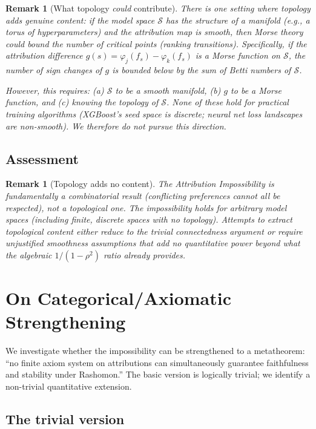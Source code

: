 \documentclass{article}
\newtheorem{remark}[theorem]{Remark}
\begin{document}
\begin{remark}[What topology \emph{could} contribute]
There is one setting where topology adds genuine content: if the
model space $\mathcal{S}$ has the structure of a manifold (e.g.,
a torus of hyperparameters) and the attribution map is smooth,
then Morse theory could bound the number of critical points
(ranking transitions). Specifically, if the attribution difference
$g(s) = \varphi_j(f_s) - \varphi_k(f_s)$ is a Morse function on
$\mathcal{S}$, the number of sign changes of $g$ is bounded below
by the sum of Betti numbers of $\mathcal{S}$.

However, this requires: (a) $\mathcal{S}$ to be a smooth manifold,
(b) $g$ to be a Morse function, and (c) knowing the topology of
$\mathcal{S}$. None of these hold for practical training algorithms
(XGBoost's seed space is discrete; neural net loss landscapes are
non-smooth). We therefore do not pursue this direction.
\end{remark}

\subsection{Assessment}

\begin{remark}[Topology adds no content]
\label{rem:topology-trivial}
The Attribution Impossibility is fundamentally a \emph{combinatorial}
result (conflicting preferences cannot all be respected), not a
\emph{topological} one. The impossibility holds for arbitrary model
spaces (including finite, discrete spaces with no topology). Attempts
to extract topological content either reduce to the trivial
connectedness argument or require unjustified smoothness assumptions
that add no quantitative power beyond what the algebraic
$1/(1-\rho^2)$ ratio already provides.
\end{remark}


\section{On Categorical/Axiomatic Strengthening}
\label{sec:categorical}

We investigate whether the impossibility can be strengthened to a
metatheorem: ``no finite axiom system on attributions can
simultaneously guarantee faithfulness and stability under
Rashomon.'' The basic version is logically trivial; we identify
a non-trivial quantitative extension.

\subsection{The trivial version}
\end{document}
